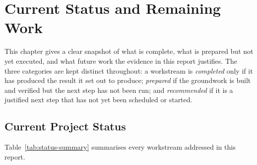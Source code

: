 \chapter{Current Status and Remaining Work}
\label{ch:status}

This chapter gives a clear snapshot of what is complete, what is prepared
but not yet executed, and what future work the evidence in this report
justifies. The three categories are kept distinct throughout: a workstream
is \emph{completed} only if it has produced the result it set out to
produce; \emph{prepared} if the groundwork is built and verified but the
next step has not been run; and \emph{recommended} if it is a justified
next step that has not yet been scheduled or started.

\section{Current Project Status}
\label{sec:status-current}

Table~\ref{tab:status-summary} summarises every workstream addressed in
this report.

